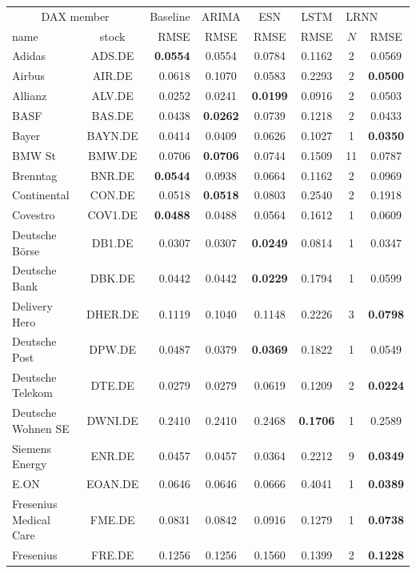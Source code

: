 \documentclass{sn-jnl}
\theoremstyle{definition}
\begin{document}
\begin{table}[b]
\begin{tabular}{l@{ }crccccc}
\toprule
\multicolumn{2}{c}{DAX member} & Baseline & ARIMA & ESN & LSTM & \multicolumn{2}{l}{LRNN}\\
name & stock & RMSE & RMSE & RMSE & RMSE & $N$ & RMSE\\ \midrule
Adidas & ADS.DE & \textbf{0.0554} & 0.0554 & 0.0784 & 0.1162 & 2 & 0.0569\\
Airbus & AIR.DE & 0.0618 & 0.1070 & 0.0583 & 0.2293 & 2 & \textbf{0.0500}\\
Allianz & ALV.DE & 0.0252 & 0.0241 & \textbf{0.0199} & 0.0916 & 2 & 0.0503\\
BASF & BAS.DE & 0.0438 & \textbf{0.0262} & 0.0739 & 0.1218 & 2 & 0.0433\\
Bayer & BAYN.DE & 0.0414 & 0.0409 & 0.0626 & 0.1027 & 1 & \textbf{0.0350}\\
BMW St & BMW.DE & 0.0706 & \textbf{0.0706} & 0.0744 & 0.1509 & 11 & 0.0787\\
Brenntag & BNR.DE & \textbf{0.0544} & 0.0938 & 0.0664 & 0.1162 & 2 & 0.0969\\
Continental & CON.DE & 0.0518 & \textbf{0.0518} & 0.0803 & 0.2540 & 2 & 0.1918\\
Covestro & COV1.DE & \textbf{0.0488} & 0.0488 & 0.0564 & 0.1612 & 1 & 0.0609\\
Deutsche Börse & DB1.DE & 0.0307 & 0.0307 & \textbf{0.0249} & 0.0814 & 1 & 0.0347\\
Deutsche Bank & DBK.DE & 0.0442 & 0.0442 & \textbf{0.0229} & 0.1794 & 1 & 0.0599\\
Delivery Hero & DHER.DE & 0.1119 & 0.1040 & 0.1148 & 0.2226 & 3 & \textbf{0.0798}\\
Deutsche Post & DPW.DE & 0.0487 & 0.0379 & \textbf{0.0369} & 0.1822 & 1 & 0.0549\\
Deutsche Telekom & DTE.DE & 0.0279 & 0.0279 & 0.0619 & 0.1209 & 2 & \textbf{0.0224}\\
Deutsche Wohnen SE & DWNI.DE & 0.2410 & 0.2410 & 0.2468 & \textbf{0.1706} & 1 & 0.2589\\
Siemens Energy & ENR.DE & 0.0457 & 0.0457 & 0.0364 & 0.2212 & 9 & \textbf{0.0349}\\
E.ON & EOAN.DE & 0.0646 & 0.0646 & 0.0666 & 0.4041 & 1 & \textbf{0.0389}\\
Fresenius Medical Care & FME.DE & 0.0831 & 0.0842 & 0.0916 & 0.1279 & 1 & \textbf{0.0738}\\
Fresenius & FRE.DE & 0.1256 & 0.1256 & 0.1560 & 0.1399 & 2 & \textbf{0.1228}\\

\end{tabular}
\end{table}
\end{document}
